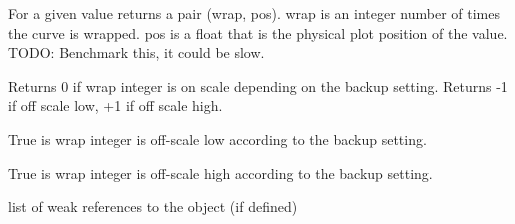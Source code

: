 \documentclass[letterpaper,10pt,english]{sphinxmanual}
\begin{document}
\begin{fulllineitems}

\begin{fulllineitems}
\label{\detokenize{ref/util/plot/PRESCfg:TotalDepth.util.plot.PRESCfg.LineTransBase.wrapPos}}
For a given value returns a pair (wrap, pos).
wrap is an integer number of times the curve is wrapped.
pos is a float that is the physical plot position of the value.
TODO: Benchmark this, it could be slow.

\end{fulllineitems}


\begin{fulllineitems}
\label{\detokenize{ref/util/plot/PRESCfg:TotalDepth.util.plot.PRESCfg.LineTransBase.offScale}}
Returns 0 if wrap integer is on scale depending on the backup setting.
Returns -1 if off scale low, +1 if off scale high.

\end{fulllineitems}


\begin{fulllineitems}
\label{\detokenize{ref/util/plot/PRESCfg:TotalDepth.util.plot.PRESCfg.LineTransBase.isOffScaleLeft}}
True is wrap integer is off-scale low according to the backup setting.

\end{fulllineitems}


\begin{fulllineitems}
\label{\detokenize{ref/util/plot/PRESCfg:TotalDepth.util.plot.PRESCfg.LineTransBase.isOffScaleRight}}
True is wrap integer is off-scale high according to the backup setting.

\end{fulllineitems}


\begin{fulllineitems}
\label{\detokenize{ref/util/plot/PRESCfg:TotalDepth.util.plot.PRESCfg.LineTransBase.__weakref__}}
list of weak references to the object (if defined)

\end{fulllineitems}


\end{fulllineitems}
\end{document}
